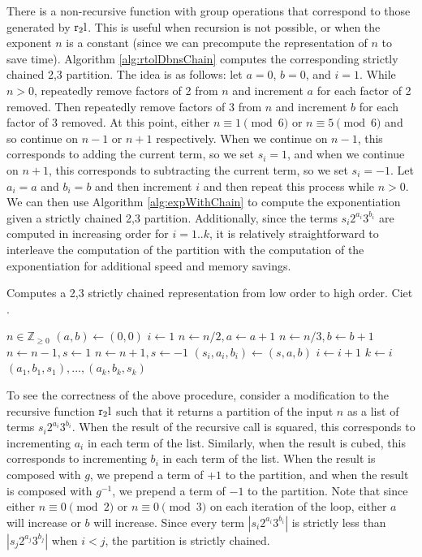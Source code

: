 \documentclass{ucalgthes1}
\theoremstyle{plain}
\theoremstyle{definition}
\newcommand{\ZZgez}{\mathbb{Z}_{\ge 0}}
\begin{document}
There is a non-recursive function with group operations that correspond to those generated by $\textrm{r}_2\textrm{l}$. This is useful when recursion is not possible, or when the exponent $n$ is a constant (since we can precompute the representation of $n$ to save time). Algorithm \ref{alg:rtolDbnsChain} computes the corresponding strictly chained 2,3 partition.  The idea is as follows: let $a = 0$, $b=0$, and $i=1$.  While $n > 0$, repeatedly remove factors of 2 from $n$ and increment $a$ for each factor of 2 removed. Then repeatedly remove factors of 3 from $n$ and increment $b$ for each factor of 3 removed. At this point, either $n \equiv 1 \pmod 6$ or $n \equiv 5 \pmod 6$ and so continue on $n-1$ or $n+1$ respectively.  When we continue on $n-1$, this corresponds to adding the current term, so we set $s_i=1$, and when we continue on $n+1$, this corresponds to subtracting the current term, so we set $s_i=-1$. Let $a_i = a$ and $b_i = b$ and then increment $i$ and then repeat this process while $n > 0$.  We can then use Algorithm \ref{alg:expWithChain} to compute the exponentiation given a strictly chained 2,3 partition. Additionally, since the terms $s_i2^{a_i}3^{b_i}$ are computed in increasing order for $i=1..k$, it is relatively straightforward to interleave the computation of the partition with the computation of the exponentiation for additional speed and memory savings.

\begin{algorithm}[h]
\caption{Computes a 2,3 strictly chained representation from low order to high order. Ciet \cite{Ciet2006}.}
\label{alg:rtolDbnsChain}
\begin{algorithmic}[1]
\REQUIRE $n \in \ZZgez$
\STATE $(a, b) \gets (0, 0)$
\STATE $i \gets 1$
		\STATE $n \gets n / 2, a \gets a + 1$
	\ENDWHILE
		\STATE $n \gets n / 3, b \gets b + 1$
	\ENDWHILE
		\STATE $n \gets n - 1, s \gets 1$
		\STATE $n \gets n + 1, s \gets -1$
	\ENDIF
	\STATE $(s_i, a_i, b_i) \gets (s, a, b)$
	\STATE $i \gets i + 1$
\ENDWHILE
\STATE $k \gets i$
\RETURN $(a_1, b_1, s_1), ..., (a_k, b_k, s_k)$
\end{algorithmic}
\end{algorithm}

To see the correctness of the above procedure, consider a modification to the recursive function $\textrm{r}_2\textrm{l}$ such that it returns a partition of the input $n$ as a list of terms $s_i2^{a_i}3^{b_i}$. When the result of the recursive call is squared, this corresponds to incrementing $a_i$ in each term of the list.  Similarly, when the result is cubed, this corresponds to incrementing $b_i$ in each term of the list. When the result is composed with $g$, we prepend a term of $+1$ to the partition, and when the result is composed with $g^{-1}$, we prepend a term of $-1$ to the partition. Note that since either $n \equiv 0 \pmod 2$ or $n \equiv 0 \pmod 3$ on each iteration of the loop, either $a$ will increase or $b$ will increase. Since every term $|s_i2^{a_i}3^{b_i}|$ is strictly less than $|s_j2^{a_j}3^{b_j}|$ when $i < j$, the partition is strictly chained.
\end{document}
